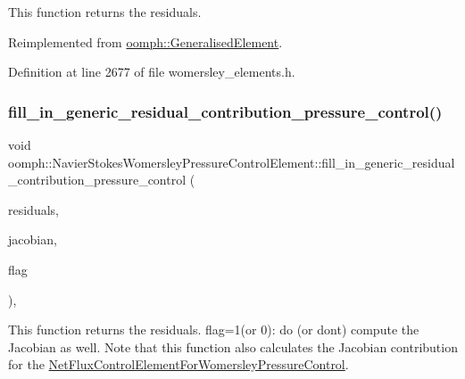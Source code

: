 This function returns the residuals. 



Reimplemented from \hyperlink{classoomph_1_1GeneralisedElement_a310c97f515e8504a48179c0e72c550d7}{oomph\+::\+Generalised\+Element}.



Definition at line 2677 of file womersley\+\_\+elements.\+h.

\mbox{\label{classoomph_1_1NavierStokesWomersleyPressureControlElement_a615400a9e8489a2ea7e1b1722d98c95e}} 
\subsubsection{\texorpdfstring{fill\+\_\+in\+\_\+generic\+\_\+residual\+\_\+contribution\+\_\+pressure\+\_\+control()}{fill\_in\_generic\_residual\_contribution\_pressure\_control()}}
{\footnotesize\ttfamily void oomph\+::\+Navier\+Stokes\+Womersley\+Pressure\+Control\+Element\+::fill\+\_\+in\+\_\+generic\+\_\+residual\+\_\+contribution\+\_\+pressure\+\_\+control (\begin{DoxyParamCaption}\item[{\hyperlink{classoomph_1_1Vector}{Vector}$<$ double $>$ \&}]{residuals,  }\item[{\hyperlink{classoomph_1_1DenseMatrix}{Dense\+Matrix}$<$ double $>$ \&}]{jacobian,  }\item[{const unsigned \&}]{flag }\end{DoxyParamCaption})\hspace{0.3cm}{\ttfamily [inline]}, {\ttfamily [protected]}}



This function returns the residuals. flag=1(or 0)\+: do (or don\textquotesingle{}t) compute the Jacobian as well. Note that this function also calculates the Jacobian contribution for the \hyperlink{classoomph_1_1NetFluxControlElementForWomersleyPressureControl}{Net\+Flux\+Control\+Element\+For\+Womersley\+Pressure\+Control}. 



